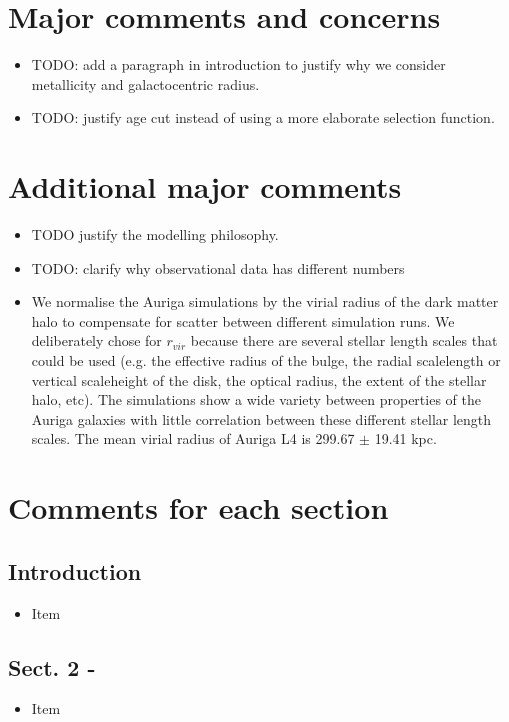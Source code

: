 \documentclass{article}
\begin{document}
\section*{Major comments and concerns}
\begin{itemize}
\item TODO: add a paragraph in introduction to justify why we consider metallicity
and galactocentric radius.
\item TODO: justify age cut instead of using a more elaborate selection function.
\end{itemize}


\section*{Additional major comments}
\begin{itemize}
\item TODO justify the modelling philosophy.
\item TODO: clarify why observational data has different numbers
\item We normalise the Auriga simulations by the virial radius of the
dark matter halo to compensate for scatter between different simulation runs. We
deliberately chose for $r_{vir}$ because there are several stellar length scales
that could be used (e.g. the effective radius of the bulge, the radial scalelength
or vertical scaleheight of the disk, the optical radius, the extent of the stellar 
halo, etc). The simulations show a wide variety between properties of the Auriga
galaxies with little correlation between these different stellar length scales.
The mean virial radius of Auriga L4 is 299.67 $\pm$ 19.41 kpc.

\end{itemize}


\section*{Comments for each section}
\subsection*{Introduction}
\begin{itemize}
\item Item
\end{itemize}

\subsection*{Sect. 2 -}
\begin{itemize}
\item Item
\end{itemize}
\end{document}
